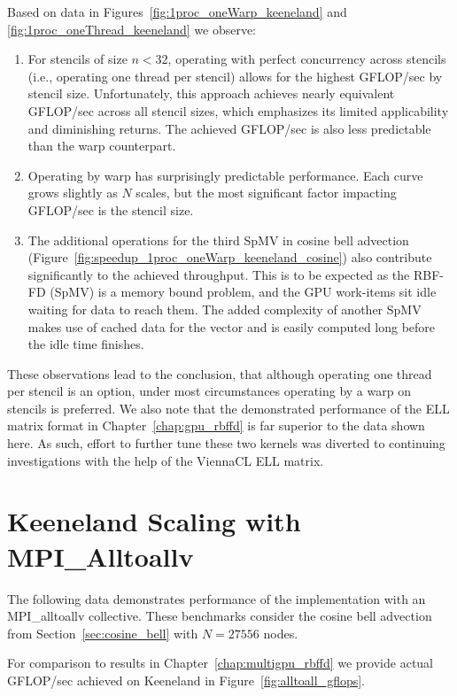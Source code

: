 Based on data in Figures~\ref{fig:1proc_oneWarp_keeneland} and \ref{fig:1proc_oneThread_keeneland} we observe: 
\begin{enumerate} 
\item For stencils of size $n < 32$, operating with perfect concurrency across stencils (i.e., operating one thread per stencil) allows for the highest GFLOP/sec by stencil size. Unfortunately, this approach achieves nearly equivalent GFLOP/sec across all stencil sizes, which emphasizes its limited applicability and diminishing returns. The achieved GFLOP/sec is also less predictable than the warp counterpart. 
\item Operating by warp has surprisingly predictable performance. Each curve grows slightly as $N$ scales, but the most significant factor impacting GFLOP/sec is the stencil size.
\item The additional operations for the third SpMV in cosine bell advection (Figure~\ref{fig:speedup_1proc_oneWarp_keeneland_cosine}) also contribute significantly to the achieved throughput. This is to be expected as the RBF-FD (SpMV) is a memory bound problem, and the GPU work-items sit idle waiting for data to reach them. The added complexity of another SpMV makes use of cached data for the vector and is easily computed long before the idle time finishes. 
\end{enumerate}
These observations lead to the conclusion, that although operating one thread per stencil is an option, under most circumstances operating by a warp on stencils is preferred. We also note that the demonstrated performance of the ELL matrix format in Chapter~\ref{chap:gpu_rbffd} is far superior to the data shown here. As such, effort to further tune these two kernels was diverted to continuing investigations with the help of the ViennaCL ELL matrix. 


\section{Keeneland Scaling with MPI\_Alltoallv}

The following data demonstrates performance of the implementation with an MPI\_alltoallv collective. These benchmarks consider the cosine bell advection from Section~\ref{sec:cosine_bell} with $N=27556$ nodes. 

For comparison to results in Chapter~\ref{chap:multigpu_rbffd} we provide actual GFLOP/sec achieved on Keeneland in Figure~\ref{fig:alltoall_gflops}. 


